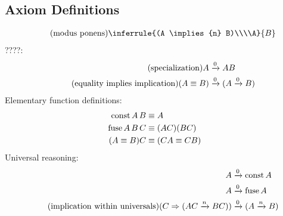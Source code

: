 \documentclass{article}
\begin{document}
  \subsection{Axiom Definitions}
  \begin{gather*}
    \tag{modus ponens}\label{mp}
    \inferrule{(A \implies{n} B)\\\\A}{B}\\
  \end{gather*}
  ????:
  \begin{align*}
    \tag{specialization}\label{specialization}
    A &\xrightarrow{0} AB\\
    \tag{equality implies implication}
    (A \equiv B) &\xrightarrow{0} (A \xrightarrow{0} B)\\
  \end{align*}
  Elementary function definitions:
  \begin{align*}
    \operatorname{\mathrm{const}} A\,B &\equiv A\\
    \operatorname{\mathrm{fuse}} A\,B\,C &\equiv (AC)(BC)\\
    (A \equiv B) C &\equiv (CA \equiv CB)\\
  \end{align*}
  Universal reasoning:
  \begin{align*}
    A &\xrightarrow{0} \operatorname{\mathrm{const}} A\\
    A &\xrightarrow{0} \operatorname{\mathrm{fuse}} A\\
    \tag{implication within universals}
    (C \Rightarrow (AC \xrightarrow{n} BC)) &\xrightarrow{0} (A \xrightarrow{n} B)
  \end{align*}
\end{document}
